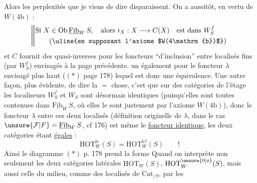 Alors les perplexités que je viens de dire disparaissent. On a aussitôt, en vertu de $W(4\mathrm{b})$ :
\[
\left|\!\left|\!\left|\begin{aligned}
&\text{Si }X\in\mathrm{Ob}\,\underline{\mathrm{Fib}}_W\,S,\quad\text{alors }i_X:X\longrightarrow C(X)\quad\text{est dans }W_S^f\\
&\qquad\text{(\uline{en supposant l'axiome $W(4\mathrm{b})$})}
\end{aligned}\right.\right.\right.
\]
et $C$ fournit des quasi-inverses pour les foncteurs
``d'inclusion'' entre localisés fins (par $W_S^f$) envisagés à la
page précédente.  un également
pour le foncteur $\lambda$ envisagé plus haut ($(*)$ page 178)
lequel est donc une équivalence. Une autre façon,
plus évidente, de dire la $=$ chose, c'est que sur
 des catégories de l'étage les  localiseurs $W_S^f$ et $W_S$
sont désormais identiques (puisqu'elles sont toutes
contenues dans $\underline{\mathrm{Fib}}_W\,S$, où elles le sont justement par
l'axiome $W(4\mathrm{b})$), donc le foncteur $\lambda$ entre
ces deux localisés (définition originelle de $\lambda$,
dans le cas $\unsure{\mathcal{F}|F}=\underline{\mathrm{Fib}}_W\,S$, cf  176) est même
le \uline{foncteur identique}, les deux catégories  étant \uline{égales} :
\[
\mathrm{HOT}_W^{\mathrm{lc}}(S)=\mathrm{HOT}_W^{\mathrm{lc}!}(S)\qquad !
\]
Ainsi le diagramme $(*)$ p. 178 prend la forme
Quand on interprète non seulement les deux catégories
latérales $\mathrm{HOT}_W(S)$, $\mathrm{HOT}_W^{\unsure{0|o}}(S)$, mais aussi celle du
milieu, comme des localisés de $\mathrm{Cat}_{/S}$, par les
